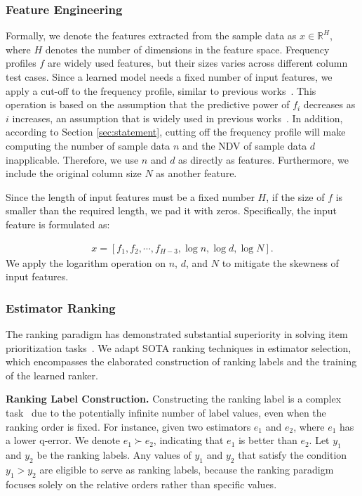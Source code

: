 \subsubsection{Feature Engineering} \label{sec:fe}
Formally, we denote the features extracted from the sample data as $x\in\mathbb{R}^{ H}$, where $H$ denotes the number of dimensions in the feature space. Frequency profiles $f$ are widely used features, but their sizes varies across different column test cases. Since a learned model needs a fixed number of input features, we apply a cut-off to the frequency profile, similar to previous works~\cite{ls_wu2022learning,li2024learning}. This operation is based on the assumption that the predictive power of $f_i$ decreases as $i$ increases, an assumption that is widely used in previous works~\cite{ls_wu2022learning,li2024learning,chao1984nonparametric,gee_charikar2000towards,hybskew_haas1995sampling}. In addition, according to Section \ref{sec:statement}, cutting off the frequency profile will make computing the number of sample data $n$ and the NDV of sample data $d$ inapplicable. Therefore, we use $n$ and $d$ as directly as features. Furthermore, we include the original column size $N$ as another feature.

Since the length of input features must be a fixed number $H$, if the size of $f$ is smaller than the required length, we pad it with zeros. Specifically, the input feature is formulated as:

\begin{align}
    x = [f_1, f_2, \cdots, f_{H-3}, \log n, \log d, \log N].
\end{align}
We apply the logarithm operation on $n$, $d$, and $N$ to mitigate the skewness of input features.





\subsubsection{Estimator Ranking} 
The ranking paradigm has demonstrated substantial superiority in solving item prioritization tasks~\cite{liu2009learning,bruch2019revisiting,listmle_xia2008listwise,TensorflowRankingKDD2019,wang2018lambdaloss}. We adapt SOTA ranking techniques in estimator selection, which encompasses the elaborated construction of ranking labels and the training of the learned ranker.



\noindent\textbf{Ranking Label Construction.} Constructing the ranking label is a complex task~\cite{wang2013theoretical} due to the potentially infinite number of label values, even when the ranking order is fixed. For instance, given two estimators $e_1$ and $e_2$, where $e_1$ has a lower q-error. We denote $e_1\succ e_2$, indicating that $e_1$ is better than $e_2$. Let $y_1$ and $y_2$ be the ranking labels. Any values of $y_1$ and $y_2$ that satisfy the condition $y_1>y_2$ are eligible to serve as ranking labels, because the ranking paradigm focuses solely on the relative orders rather than specific values. 

